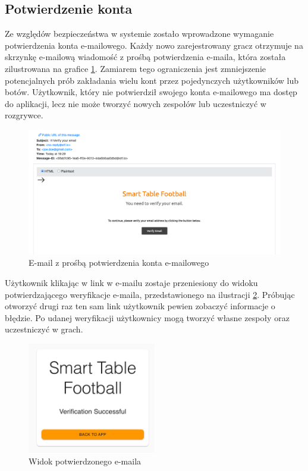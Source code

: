 \subsection{Potwierdzenie konta}

Ze względów bezpieczeństwa w systemie zostało wprowadzone wymaganie potwierdzenia konta e-mailowego. Każdy nowo zarejestrowany gracz otrzymuje na skrzynkę e-mailową wiadomość z prośbą potwierdzenia e-maila, która została zilustrowana na grafice \ref{fig:verifyEmail}. Zamiarem tego ograniczenia jest zmniejszenie potencjalnych prób zakładania wielu kont przez pojedynczych użytkowników lub botów. Użytkownik, który nie potwierdził swojego konta e-mailowego ma dostęp do aplikacji, lecz nie może tworzyć nowych zespołów lub uczestniczyć w rozgrywce.

\begin{figure}[h!]
  \centering
    \includegraphics[width=\textwidth]{images/api/verify_email.png}
  \caption{E-mail z prośbą potwierdzenia konta e-mailowego}
  \label{fig:verifyEmail}
\end{figure}

Użytkownik klikając w link w e-mailu zostaje przeniesiony do widoku potwierdzającego weryfikacje e-maila, przedstawionego na ilustracji \ref{fig:verfied-email-confirmation}. Próbując otworzyć drugi raz ten sam link użytkownik pewien zobaczyć informacje o błędzie. Po udanej weryfikacji użytkownicy mogą tworzyć własne zespoły oraz uczestniczyć w grach.

\begin{figure}[h!]
  \centering
    \includegraphics[width=0.5\textwidth]{images/player/verfied_emial_confirmation.png}
  \caption{Widok potwierdzonego e-maila}
  \label{fig:verfied-email-confirmation}
\end{figure}

